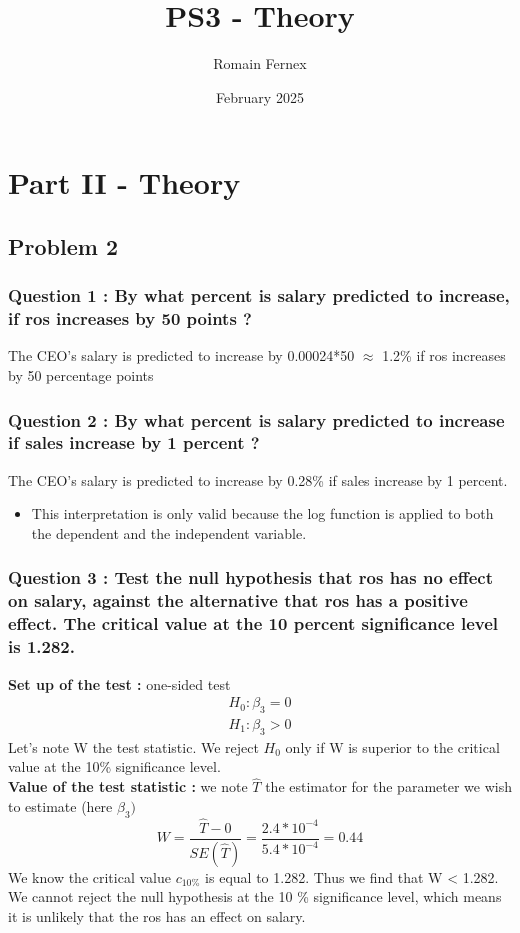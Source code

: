 \documentclass{article}
\title{PS3 - Theory}
\author{Romain Fernex}
\date{February 2025}
\begin{document}
\maketitle
\tableofcontents


\section{Part II - Theory}

\subsection{Problem 2}

\subsubsection{Question 1 : By what percent is salary predicted to increase, if ros increases by 50 points ?}

The CEO's salary is predicted to increase by 0.00024*50 $\approx$ 1.2\% if ros increases by 50 percentage points


\subsubsection{Question 2 : By what percent is salary predicted to increase if sales increase by 1 percent ?}
The CEO's salary is predicted to increase by 0.28\% if sales increase by 1 percent. 
\begin{itemize}
    \item This interpretation is only valid because the log function is applied to both the dependent and the independent variable. 
\end{itemize}

\subsubsection{Question 3 : Test the null hypothesis that ros has no effect on salary, against the alternative that ros has a positive effect. The critical value at the 10 percent significance level is 1.282.}
\textbf{Set up of the test : }one-sided test 
\begin{equation}
\begin{aligned}
    H_0 : \beta_3 = 0\\
    H_1 : \beta_3 >0
\end{aligned}
\end{equation}
Let's note W the test statistic. We reject $H_0$ only if W is superior to the critical value at the 10\% significance level.\\ 
\textbf{Value of the test statistic : } we note $\hat{T}$ the estimator for the parameter we wish to estimate (here $\beta_3)$
\begin{equation}
    W = \frac{\hat{T}-0}{SE(\hat{T})} = \frac{2.4*10^{-4}}{5.4*10^{-4}} = 0.44
\end{equation}
We know the critical value $c_{10\%}$ is equal to 1.282. Thus we find that W < 1.282.
We cannot reject the null hypothesis at the 10 \% significance level, which means it is unlikely that the ros has an effect on salary. 
\end{document}
